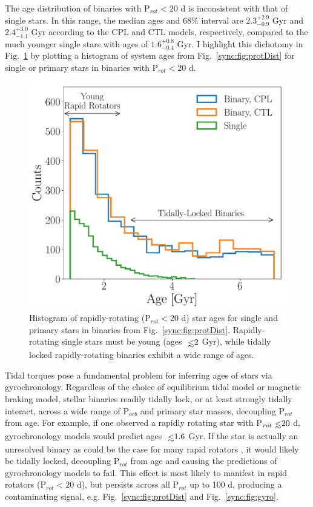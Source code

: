 The age distribution of binaries with P$_{rot} < 20$ d is inconsistent with that of single stars. In this range, the median ages and $68\%$ interval are $2.3^{+2.9}_{-0.9}$ Gyr and $2.4^{+3.0}_{-1.1}$ Gyr according to the CPL and CTL models, respectively, compared to the much younger single stars with ages of $1.6^{+0.8}_{-0.4}$ Gyr. I highlight this dichotomy in Fig.~\ref{sync:fig:protAgeHist} by plotting a histogram of system ages from Fig.~\ref{sync:fig:protDist} for single or primary stars in binaries with P$_{rot} < 20$ d. 

\begin{figure}
	\includegraphics[width=\columnwidth]{protAgeHist.pdf}
   \caption{Histogram of rapidly-rotating (P$_{rot} < 20$ d) star ages for single and primary stars in binaries from Fig.~\ref{sync:fig:protDist}. Rapidly-rotating single stars must be young (ages $\lsim 2$ Gyr), while tidally locked rapidly-rotating binaries exhibit a wide range of ages.}%
    \label{sync:fig:protAgeHist}%
\end{figure}

Tidal torques pose a fundamental problem for inferring ages of stars via gyrochronology. Regardless of the choice of equilibrium tidal model or magnetic braking model, stellar binaries readily tidally lock, or at least strongly tidally interact, across a wide range of P$_{orb}$ and primary star masses, decoupling P$_{rot}$ from age. For example, if one observed a rapidly rotating star with P$_{rot} \lsim 20$ d, gyrochronology models would predict ages $\lsim 1.6$ Gyr. If the star is actually an unresolved binary as could be the case for many \kepler rapid rotators \citep{Simonian2018}, it would likely be tidally locked, decoupling P$_{rot}$ from age and causing the predictions of gyrochronology models to fail. This effect is most likely to manifest in rapid rotators (P$_{rot} < 20$ d), but persists across all P$_{rot}$ up to 100 d, producing a contaminating signal, e.g. Fig.~\ref{sync:fig:protDist} and Fig.~\ref{sync:fig:gyro}.

